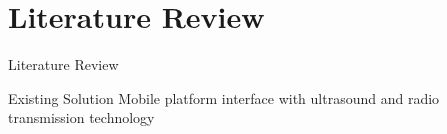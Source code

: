 \documentclass{beamer}
\begin{document}


\section{Literature Review}

\begin{frame}{Literature Review}
  \begin{block}{Existing Solution}
        Mobile platform interface with ultrasound and radio transmission technology~\cite{Sales2016-CompaRob}
  \end{block}
\end{frame}
\end{document}
